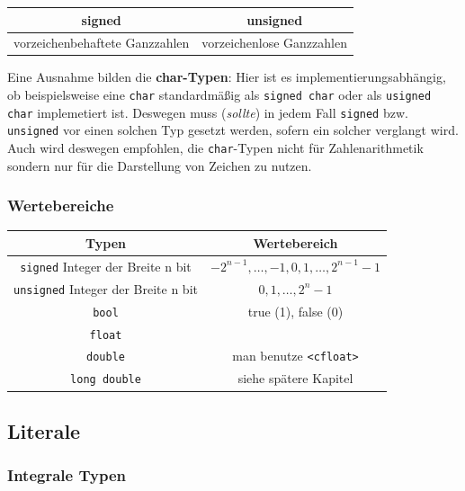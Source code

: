 \documentclass[a4paper]{report}
\begin{document}
\begin{center}
\begin{tabular}{c|c}
	\textbf{signed} & \textbf{unsigned} \\ \hline
	vorzeichenbehaftete Ganzzahlen & vorzeichenlose Ganzzahlen
\end{tabular}
\end{center}
 
Eine Ausnahme bilden die \textbf{char-Typen}: Hier ist es implementierungsabhängig, ob beispielsweise eine \texttt{char} standardmäßig als \texttt{signed char} oder als \texttt{usigned char} implemetiert ist. Deswegen muss (\textit{sollte}) in jedem Fall \texttt{signed} bzw. \texttt{unsigned} vor einen solchen Typ gesetzt werden, sofern ein solcher verglangt wird. Auch wird deswegen empfohlen, die \texttt{char}-Typen nicht für Zahlenarithmetik sondern nur für die Darstellung von Zeichen zu nutzen.

\subsubsection{Wertebereiche}

\begin{center}
\begin{tabular}{|c|c|}
	\hline
	\textbf{Typen}	& \textbf{Wertebereich} \\ \hline
	\texttt{signed} Integer der Breite n bit & $-2^{n-1}, \dots , -1,0,1, \dots ,2^{n-1}-1$ \\ 
	\texttt{unsigned} Integer der Breite n bit & $0,1, \dots ,2^{n}-1$ \\\hline
	\texttt{bool} & true (1), false (0) \\ \hline
	\texttt{float} & \\
	\texttt{double} & man benutze \texttt{<cfloat>}\\%
	\texttt{long double} & siehe spätere Kapitel\\ \hline
	
\end{tabular}
\end{center}


\subsection{Literale}

\subsubsection{Integrale Typen}
\end{document}
